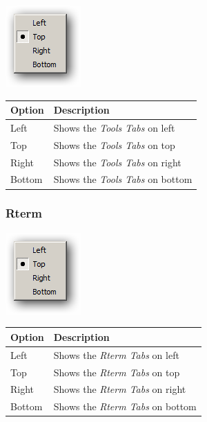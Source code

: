 \includegraphics[scale=0.50]{./res/menu_view_tabs_tools.png}\\

\begin{scriptsize}\begin{tabularx}{\textwidth}{>{\hsize=0.3\hsize}X>{\hsize=0.7\hsize}X}\\
    \hline
    \textbf{Option} & \textbf{Description} \\
    \hline
    Left & Shows the \textit{Tools Tabs} on left \\
    Top & Shows the \textit{Tools Tabs} on top \\
    Right & Shows the \textit{Tools Tabs} on right \\
    Bottom & Shows the \textit{Tools Tabs} on bottom \\
    \hline
  \end{tabularx}\end{scriptsize}


\hypertarget{menu_view_tabs_rterm}{}
\subsubsection{Rterm}

\includegraphics[scale=0.50]{./res/menu_view_tabs_rterm.png}\\

\begin{scriptsize}\begin{tabularx}{\textwidth}{>{\hsize=0.3\hsize}X>{\hsize=0.7\hsize}X}\\
    \hline
    \textbf{Option} & \textbf{Description} \\
    \hline
    Left & Shows the \textit{Rterm Tabs} on left \\
    Top & Shows the \textit{Rterm Tabs} on top \\
    Right & Shows the \textit{Rterm Tabs} on right \\
    Bottom & Shows the \textit{Rterm Tabs} on bottom \\
    \hline
  \end{tabularx}\end{scriptsize}



